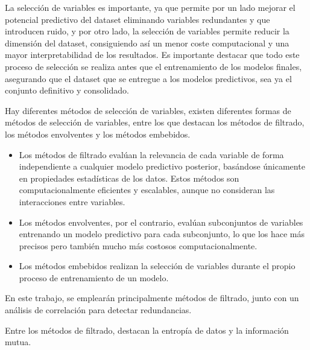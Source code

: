 \begin{itemize}
    La selección de variables es importante, ya que permite por un lado mejorar el potencial predictivo del dataset eliminando variables redundantes y que introducen ruido, y por otro lado, la selección de variables permite reducir la dimensión del dataset, consiguiendo así un menor coste computacional y una mayor interpretabilidad de los resultados. Es importante destacar que todo este proceso de selección se realiza antes que el entrenamiento de los modelos finales, asegurando que el dataset que se entregue a los modelos predictivos, sea ya el conjunto definitivo y consolidado.

    Hay diferentes métodos de selección de variables, existen diferentes formas de métodos de selección de variables, entre los que destacan los métodos de filtrado, los métodos envolventes y los métodos embebidos. 
    
    \begin{itemize}
        \item Los métodos de filtrado evalúan la relevancia de cada variable de forma independiente a cualquier modelo predictivo posterior, basándose únicamente en propiedades estadísticas de los datos. Estos métodos son computacionalmente eficientes y escalables, aunque no consideran las interacciones entre variables. 
        \item Los métodos envolventes, por el contrario, evalúan subconjuntos de variables entrenando un modelo predictivo para cada subconjunto, lo que los hace más precisos pero también mucho más costosos computacionalmente. 
        \item Los métodos embebidos realizan la selección de variables durante el propio proceso de entrenamiento de un modelo. 
    \end{itemize}

    En este trabajo, se emplearán principalmente métodos de filtrado, junto con un análisis de correlación para detectar redundancias.

    Entre los métodos de filtrado, destacan la entropía de datos y la información mutua. 
    

\end{itemize}
